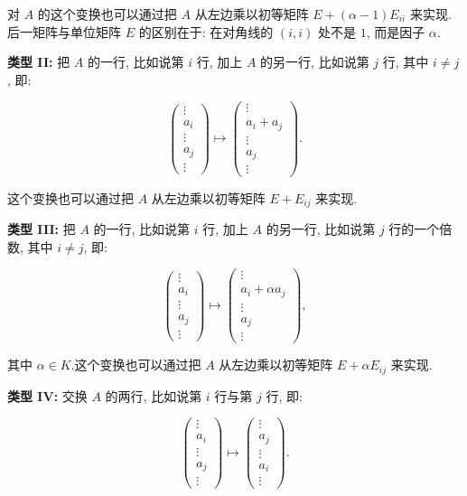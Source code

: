 对 $A$ 的这个变换也可以通过把 $A$ 从左边乘以初等矩阵 $E + (\alpha - 1)E_{ii}$ 来实现.后一矩阵与单位矩阵 $E$ 的区别在于: 在对角线的 $(i, i)$ 处不是 $1$, 而是因子 $\alpha$.

\textbf{类型 II:} 把 $A$ 的一行, 比如说第 $i$ 行, 加上 $A$ 的另一行, 比如说第 $j$ 行, 其中 $i \neq j$, 即:

\[
\begin{pmatrix} \vdots \\ a_i \\ \vdots \\ a_j \\ \vdots \end{pmatrix}
\longmapsto
\begin{pmatrix} \vdots \\ a_i + a_j \\ \vdots \\ a_j \\ \vdots \end{pmatrix}\text{.}
\]

这个变换也可以通过把 $A$ 从左边乘以初等矩阵 $E + E_{ij}$ 来实现.

\textbf{类型 III:} 把 $A$ 的一行, 比如说第 $i$ 行, 加上 $A$ 的另一行, 比如说第 $j$ 行的一个倍数, 其中 $i \neq j$, 即:

\[
\begin{pmatrix} \vdots \\ a_i \\ \vdots \\ a_j \\ \vdots \end{pmatrix}
\longmapsto
\begin{pmatrix} \vdots \\ a_i + \alpha a_j \\ \vdots \\ a_j \\ \vdots \end{pmatrix},
\]

其中 $\alpha \in K$.这个变换也可以通过把 $A$ 从左边乘以初等矩阵 $E + \alpha E_{ij}$ 来实现.

\textbf{类型 IV:} 交换 $A$ 的两行, 比如说第 $i$ 行与第 $j$ 行, 即:

\[
\begin{pmatrix} \vdots \\ a_i \\ \vdots \\ a_j \\ \vdots \end{pmatrix}
\longmapsto
\begin{pmatrix} \vdots \\ a_j \\ \vdots \\ a_i \\ \vdots \end{pmatrix}\text{.}
\]

